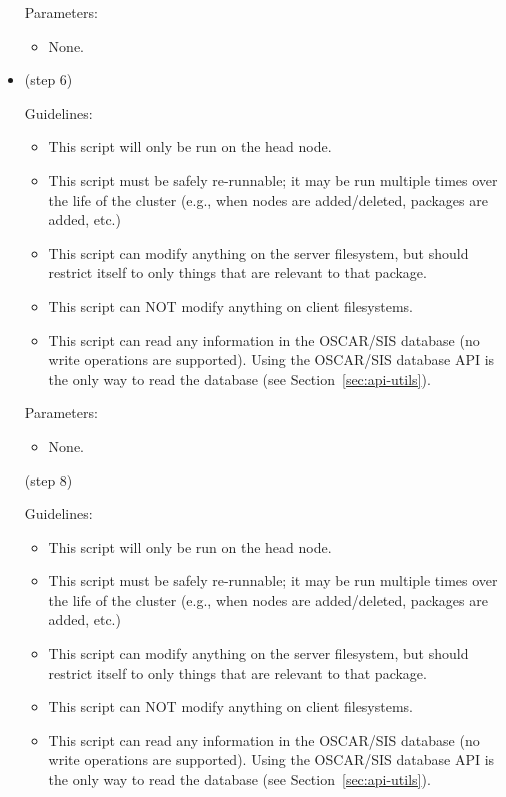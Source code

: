 \begin{itemize}
  Parameters:

  \begin{itemize}
  \item None.
  \end{itemize}

\item {} (step 6)

  Guidelines:

  \begin{itemize}
  \item This script will only be run on the head node.
  \item This script must be safely re-runnable; it may be run multiple
    times over the life of the cluster (e.g., when nodes are
    added/deleted, packages are added, etc.)
  \item This script can modify anything on the server filesystem, but
    should restrict itself to only things that are relevant to that
    package.
  \item This script can NOT modify anything on client filesystems.
  \item This script can read any information in the OSCAR/SIS database
    (no write operations are supported).  Using the OSCAR/SIS database
    API is the only way to read the database (see Section~\ref{sec:api-utils}).
  \end{itemize}

  Parameters:

  \begin{itemize}
  \item None.
  \end{itemize}
  
   (step 8)

  Guidelines:
  
  \begin{itemize}
  \item This script will only be run on the head node.
  \item This script must be safely re-runnable; it may be run multiple
    times over the life of the cluster (e.g., when nodes are
    added/deleted, packages are added, etc.)
  \item This script can modify anything on the server filesystem, but
    should restrict itself to only things that are relevant to that
    package.
  \item This script can NOT modify anything on client filesystems.
  \item This script can read any information in the OSCAR/SIS database
    (no write operations are supported).  Using the OSCAR/SIS database
    API is the only way to read the database (see Section~\ref{sec:api-utils}).
  \end{itemize}


\end{itemize}
